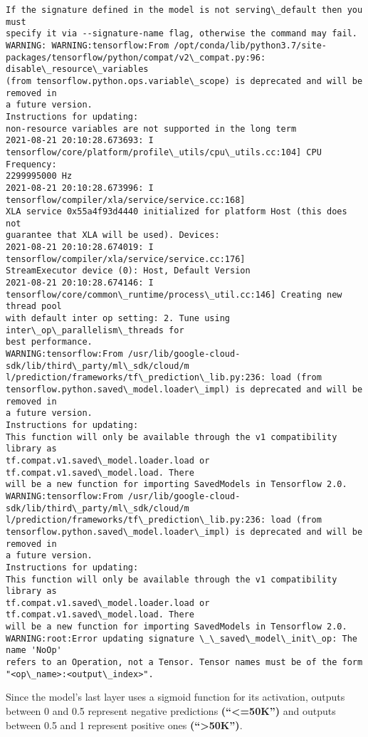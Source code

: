 \documentclass[11pt]{article}
\begin{document}
    \begin{Verbatim}[commandchars=\\\{\}]
If the signature defined in the model is not serving\_default then you must
specify it via --signature-name flag, otherwise the command may fail.
WARNING: WARNING:tensorflow:From /opt/conda/lib/python3.7/site-
packages/tensorflow/python/compat/v2\_compat.py:96: disable\_resource\_variables
(from tensorflow.python.ops.variable\_scope) is deprecated and will be removed in
a future version.
Instructions for updating:
non-resource variables are not supported in the long term
2021-08-21 20:10:28.673693: I
tensorflow/core/platform/profile\_utils/cpu\_utils.cc:104] CPU Frequency:
2299995000 Hz
2021-08-21 20:10:28.673996: I tensorflow/compiler/xla/service/service.cc:168]
XLA service 0x55a4f93d4440 initialized for platform Host (this does not
guarantee that XLA will be used). Devices:
2021-08-21 20:10:28.674019: I tensorflow/compiler/xla/service/service.cc:176]
StreamExecutor device (0): Host, Default Version
2021-08-21 20:10:28.674146: I
tensorflow/core/common\_runtime/process\_util.cc:146] Creating new thread pool
with default inter op setting: 2. Tune using inter\_op\_parallelism\_threads for
best performance.
WARNING:tensorflow:From /usr/lib/google-cloud-sdk/lib/third\_party/ml\_sdk/cloud/m
l/prediction/frameworks/tf\_prediction\_lib.py:236: load (from
tensorflow.python.saved\_model.loader\_impl) is deprecated and will be removed in
a future version.
Instructions for updating:
This function will only be available through the v1 compatibility library as
tf.compat.v1.saved\_model.loader.load or tf.compat.v1.saved\_model.load. There
will be a new function for importing SavedModels in Tensorflow 2.0.
WARNING:tensorflow:From /usr/lib/google-cloud-sdk/lib/third\_party/ml\_sdk/cloud/m
l/prediction/frameworks/tf\_prediction\_lib.py:236: load (from
tensorflow.python.saved\_model.loader\_impl) is deprecated and will be removed in
a future version.
Instructions for updating:
This function will only be available through the v1 compatibility library as
tf.compat.v1.saved\_model.loader.load or tf.compat.v1.saved\_model.load. There
will be a new function for importing SavedModels in Tensorflow 2.0.
WARNING:root:Error updating signature \_\_saved\_model\_init\_op: The name 'NoOp'
refers to an Operation, not a Tensor. Tensor names must be of the form
"<op\_name>:<output\_index>".

    \end{Verbatim}

    Since the model's last layer uses a sigmoid function for its activation,
outputs between 0 and 0.5 represent negative predictions
\textbf{(``\textless=50K'')} and outputs between 0.5 and 1 represent
positive ones \textbf{(``\textgreater50K'')}.
\end{document}

